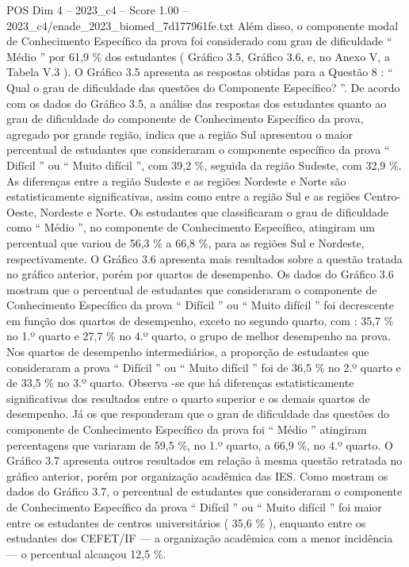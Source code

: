 \begin{textsample}{POS Dim 4 – 2023\_c4 – Score 1.00 – 2023\_c4/enade\_2023\_biomed\_7d177961fe.txt}
Além disso, o componente modal de Conhecimento Específico da prova foi considerado com grau de dificuldade “ Médio ” por 61,9 \% dos estudantes ( Gráfico 3.5, Gráfico 3.6, e, no Anexo V, a Tabela V.3 ).
O Gráfico 3.5 apresenta as respostas obtidas para a Questão 8 : “ Qual o grau de dificuldade das questões do Componente Específico? ”.
De acordo com os dados do Gráfico 3.5, a análise das respostas dos estudantes quanto ao grau de dificuldade do componente de Conhecimento Específico da prova, agregado por grande região, indica que a região Sul apresentou o maior percentual de estudantes que consideraram o componente específico da prova “ Difícil ” ou “ Muito difícil ”, com 39,2 \%, seguida da região Sudeste, com 32,9 \%.
As diferenças entre a região Sudeste e as regiões Nordeste e Norte são estatisticamente significativas, assim como entre a região Sul e as regiões Centro-Oeste, Nordeste e Norte.
Os estudantes que classificaram o grau de dificuldade como “ Médio ”, no componente de Conhecimento Específico, atingiram um percentual que variou de 56,3 \% a 66,8 \%, para as regiões Sul e Nordeste, respectivamente.
O Gráfico 3.6 apresenta mais resultados sobre a questão tratada no gráfico anterior, porém por quartos de desempenho.
Os dados do Gráfico 3.6 mostram que o percentual de estudantes que consideraram o componente de Conhecimento Específico da prova “ Difícil ” ou “ Muito difícil ” foi decrescente em função dos quartos de desempenho, exceto no segundo quarto, com : 35,7 \% no 1.º quarto e 27,7 \% no 4.º quarto, o grupo de melhor desempenho na prova.
Nos quartos de desempenho intermediários, a proporção de estudantes que consideraram a prova “ Difícil ” ou “ Muito difícil ” foi de 36,5 \% no 2.º quarto e de 33,5 \% no 3.º quarto.
Observa -se que há diferenças estatisticamente significativas dos resultados entre o quarto superior e os demais quartos de desempenho.
Já os que responderam que o grau de dificuldade das questões do componente de Conhecimento Específico da prova foi “ Médio ” atingiram percentagens que variaram de 59,5 \%, no 1.º quarto, a 66,9 \%, no 4.º quarto.
O Gráfico 3.7 apresenta outros resultados em relação à mesma questão retratada no gráfico anterior, porém por organização acadêmica das IES.
Como mostram os dados do Gráfico 3.7, o percentual de estudantes que consideraram o componente de Conhecimento Específico da prova “ Difícil ” ou “ Muito difícil ” foi maior entre os estudantes de centros universitários ( 35,6 \% ), enquanto entre os estudantes dos CEFET/IF — a organização acadêmica com a menor incidência — o percentual alcançou 12,5 \%.

\end{textsample}
